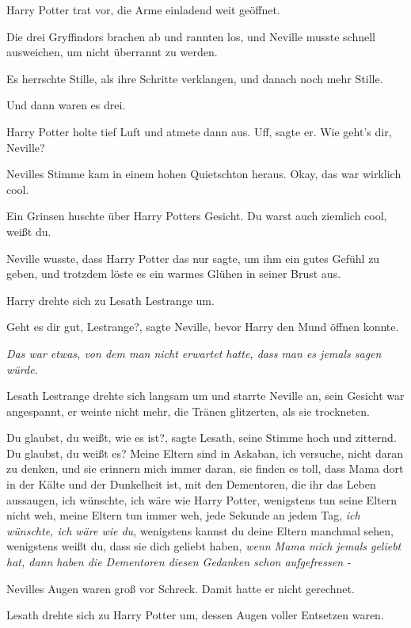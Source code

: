 Harry Potter trat vor, die Arme einladend weit geöffnet.

Die drei Gryffindors brachen ab und rannten los, und Neville musste schnell
ausweichen, um nicht überrannt zu werden.

Es herrschte Stille, als ihre Schritte verklangen, und danach noch mehr Stille.

Und dann waren es drei.

Harry Potter holte tief Luft und atmete dann aus. \glqq{}Uff\grqq{}, sagte er.
\glqq{}Wie geht's dir, Neville?\grqq{}

Nevilles Stimme kam in einem hohen Quietschton heraus. \glqq{}Okay, das war
wirklich cool.\grqq{}

Ein Grinsen huschte über Harry Potters Gesicht. \glqq{}Du warst auch ziemlich
cool, weißt du.\grqq{}

Neville wusste, dass Harry Potter das nur sagte, um ihm ein gutes Gefühl zu
geben, und trotzdem löste es ein warmes Glühen in seiner Brust aus.

Harry drehte sich zu Lesath Lestrange um.

\glqq{}Geht es dir gut, Lestrange?\grqq{}, sagte Neville, bevor Harry den Mund
öffnen konnte.

\emph{Das war etwas, von dem man nicht erwartet hatte, dass man es jemals sagen
würde.}

Lesath Lestrange drehte sich langsam um und starrte Neville an, sein Gesicht war
angespannt, er weinte nicht mehr, die Tränen glitzerten, als sie trockneten.

\glqq{}Du glaubst, du weißt, wie es ist?\grqq{}, sagte Lesath, seine Stimme hoch
und zitternd. \glqq{}Du glaubst, du weißt es? Meine Eltern sind in Askaban, ich
versuche, nicht daran zu denken, und sie erinnern mich immer daran, sie finden
es toll, dass Mama dort in der Kälte und der Dunkelheit ist, mit den
Dementoren, die ihr das Leben aussaugen, ich wünschte, ich wäre wie Harry
Potter, wenigstens tun seine Eltern nicht weh, meine Eltern tun immer weh, jede
Sekunde an jedem Tag, \emph{ich wünschte, ich wäre wie du,} wenigstens kannst du
deine Eltern manchmal sehen, wenigstens weißt du, dass sie dich geliebt haben,
\emph{wenn Mama mich jemals geliebt hat, dann haben die Dementoren diesen
Gedanken schon aufgefressen -\grqq{}}

Nevilles Augen waren groß vor Schreck. Damit hatte er nicht gerechnet.

Lesath drehte sich zu Harry Potter um, dessen Augen voller Entsetzen waren.

